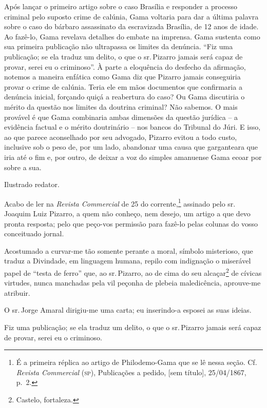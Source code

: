 \begin{didascalia}
Após lançar o primeiro artigo sobre o caso Brasília e responder a
processo criminal pelo suposto crime de calúnia, Gama voltaria para dar
a última palavra sobre o caso do bárbaro assassinato da escravizada
Brasília, de 12 anos de idade. Ao fazê-lo, Gama revelava detalhes do
embate na imprensa. Gama sustenta como sua primeira publicação não
ultrapassa os limites da denúncia. ``Fiz uma publicação; se ela traduz um
delito, o que o sr.\,Pizarro jamais será capaz de provar, serei eu o
criminoso''. À parte a eloquência do desfecho da afirmação, notemos a
maneira enfática como Gama diz que Pizarro jamais conseguiria provar o
crime de calúnia. Teria ele em mãos documentos que confirmaria a
denúncia inicial, forçando quiçá a reabertura do caso? Ou Gama
discutiria o mérito da questão nos limites da doutrina criminal? Não
sabemos. O mais provável é que Gama combinaria ambas dimensões da
questão jurídica -- a evidência factual e o mérito doutrinário -- nos
bancos do Tribunal do Júri. E isso, ao que parece aconselhado por seu
advogado, Pizarro evitou a todo custo, inclusive sob o peso de, por um
lado, abandonar uma causa que garganteara que iria até o fim e, por
outro, de deixar a voz do simples amanuense Gama ecoar por sobre a sua.
\end{didascalia}



Ilustrado redator.

Acabo de ler na \emph{Revista Commercial} de 25 do
corrente,\textsuperscript{⁠}\footnote{ É a primeira réplica ao artigo
  de Philodemo-Gama que se lê nessa seção. Cf. \emph{Revista Commercial}
  (\textsc{sp}), Publicações a pedido, {[}sem título{]}, 25/04/1867, p.~2.}
assinado pelo sr.\,Joaquim Luiz Pizarro, a quem não conheço, nem desejo,
um artigo a que devo pronta resposta; pelo que peço-vos permissão para
fazê-lo pelas colunas do vosso conceituado jornal.

Acostumado a curvar-me tão somente perante a moral, símbolo misterioso,
que traduz a Divindade, em linguagem humana, repilo com indignação o
miserável papel de ``testa de ferro'' que, ao sr.\,Pizarro, ao de cima do
seu alcaçar\textsuperscript{⁠}\footnote{Castelo, fortaleza.} de cívicas
virtudes, nunca manchadas pela vil peçonha de plebeia maledicência,
aprouve-me atribuir.

O sr.\,Jorge Amaral dirigiu-me uma carta; eu inserindo-a esposei as suas
ideias.

Fiz uma publicação; se ela traduz um delito, o que o sr.\,Pizarro jamais
será capaz de provar, serei eu o criminoso.

